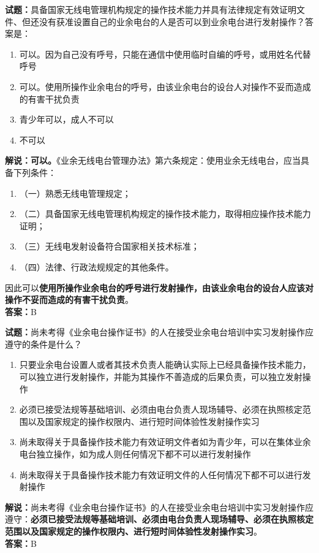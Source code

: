 \documentclass{ctexbook}
\begin{document}

\vspace{\baselineskip}

\noindent\textbf{试题：}具备国家无线电管理机构规定的操作技术能力并具有法律规定有效证明文件、但还没有获准设置自己的业余电台的人是否可以到业余电台进行发射操作？答案是：
\begin{enumerate}[leftmargin=3em]
  \item 可以。因为自己没有呼号，只能在通信中使用临时自编的呼号，或用姓名代替呼号
  \item 可以。使用所操作业余电台的呼号，由该业余电台的设台人对操作不妥而造成的有害干扰负责
  \item 青少年可以，成人不可以
  \item 不可以
\end{enumerate}
\noindent\textbf{解说：可以。}《业余无线电台管理办法》第六条规定：使用业余无线电台，应当具备下列条件：
\begin{enumerate}[label=, leftmargin=1em]
  \item （一）熟悉无线电管理规定；
  \item （二）具备国家无线电管理机构规定的操作技术能力，取得相应操作技术能力证明；
  \item （三）无线电发射设备符合国家相关技术标准；
  \item （四）法律、行政法规规定的其他条件。
\end{enumerate}
因此可以\textbf{使用所操作业余电台的呼号进行发射操作，由该业余电台的设台人应该对操作不妥而造成的有害干扰负责}。\\\noindent\textbf{答案：}B

\vspace{\baselineskip}

\noindent\textbf{试题：}尚未考得《业余电台操作证书》的人在接受业余电台培训中实习发射操作应遵守的条件是什么？
\begin{enumerate}[leftmargin=3em]
  \item 只要业余电台设置人或者其技术负责人能确认实际上已经具备操作技术能力，可以独立进行发射操作，并能为其操作不善造成的后果负责，可以独立发射操作
  \item 必须已接受法规等基础培训、必须由电台负责人现场辅导、必须在执照核定范围以及国家规定的操作权限内、进行短时间体验性发射操作实习
  \item 尚未取得关于具备操作技术能力有效证明文件者如为青少年，可以在集体业余电台独立操作，如为成人则任何情况下都不可以进行发射操作
  \item 尚未取得关于具备操作技术能力有效证明文件的人任何情况下都不可以进行发射操作
\end{enumerate}
\noindent\textbf{解说：}尚未考得《业余电台操作证书》的人在接受业余电台培训中实习发射操作应遵守：\textbf{必须已接受法规等基础培训、必须由电台负责人现场辅导、必须在执照核定范围以及国家规定的操作权限内、进行短时间体验性发射操作实习}。\\\noindent\textbf{答案：}B
\end{document}
